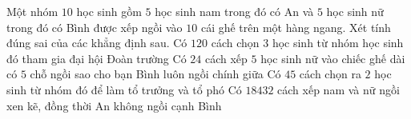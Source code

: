 \begin{ex}%
	Một nhóm $10$ học sinh gồm $5$ học sinh nam trong đó có An và $5$ học  sinh nữ trong đó có Bình được xếp ngồi vào $10$ cái ghế trên một hàng ngang. Xét tính đúng sai của các khẳng định sau.
	 \choiceTF
		{\True Có $120$ cách chọn $3$ học sinh từ nhóm học sinh đó tham gia đại  hội Đoàn trường}
		{\True Có $24$ cách xếp $5$ học sinh nữ vào chiếc ghế dài có $5$ chỗ  ngồi sao cho bạn Bình luôn ngồi chính giữa}
		 {Có $45$ cách chọn ra $2$ học sinh từ nhóm đó để làm tổ trưởng và tổ phó}
		{\True Có $18432$ cách xếp nam và nữ ngồi xen  kẽ, đồng thời An không ngồi cạnh Bình}
\end{ex}


